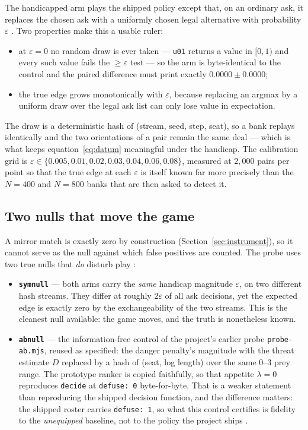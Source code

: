 \documentclass[11pt]{article}
\newcommand{\code}[1]{\texttt{#1}}
\begin{document}
The handicapped arm plays the shipped policy except that, on an ordinary ask, it replaces the chosen
ask with a uniformly chosen legal alternative with probability $\varepsilon$ \cite{probefloor}. Two
properties make this a usable ruler:

\begin{itemize}
  \item at $\varepsilon = 0$ no random draw is ever taken --- \code{u01} returns a value in $[0,1)$
  and every such value fails the $\geq \varepsilon$ test --- so the arm is byte-identical to the
  control and the paired difference must print exactly $0.0000 \pm 0.0000$;
  \item the true edge grows monotonically with $\varepsilon$, because replacing an argmax by a
  uniform draw over the legal ask list can only lose value in expectation.
\end{itemize}

The draw is a deterministic hash of (stream, seed, step, seat), so a bank replays identically and
the two orientations of a pair remain the same deal --- which is what keeps
equation~\eqref{eq:datum} meaningful under the handicap. The calibration grid is
$\varepsilon \in \{0.005, 0.01, 0.02, 0.03, 0.04, 0.06, 0.08\}$, measured at $2{,}000$ pairs per
point so that the true edge at each $\varepsilon$ is itself known far more precisely than the
$N=400$ and $N=800$ banks that are then asked to detect it.

\subsection{Two nulls that move the game}
\label{sec:nulls}

A mirror match is exactly zero by construction (Section~\ref{sec:instrument}), so it cannot serve as
the null against which false positives are counted. The probe uses two true nulls that
\emph{do} disturb play \cite{probefloor}:

\begin{itemize}
  \item \textbf{\code{symnull}} --- both arms carry the \emph{same} handicap magnitude
  $\varepsilon$, on two different hash streams. They differ at roughly $2\varepsilon$ of all ask
  decisions, yet the expected edge is exactly zero by the exchangeability of the two streams. This
  is the cleanest null available: the game moves, and the truth is nonetheless known.
  \item \textbf{\code{abnull}} --- the information-free control of the project's earlier probe
  \code{probe-ab.mjs}, reused as specified: the danger penalty's magnitude with the threat estimate
  $D$ replaced by a hash of (seat, log length) over the same $0$--$3$ prey range. The prototype
  ranker is copied faithfully, so that appetite $\lambda = 0$ reproduces \code{decide} at
  \code{defuse: 0} byte-for-byte. That is a weaker statement than reproducing the shipped decision
  function, and the difference matters: the shipped roster carries \code{defuse: 1}, so what this
  control certifies is fidelity to the \emph{unequipped} baseline, not to the policy the project
  ships \cite{probefloor}.
\end{itemize}
\end{document}
